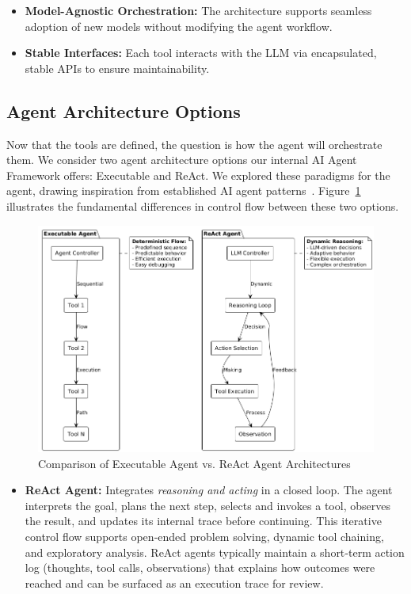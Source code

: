 \begin{spacing}{1.2}
\begin{itemize}
    \item \textbf{Model-Agnostic Orchestration:} The architecture supports seamless adoption of new models without modifying the agent workflow.
    \item \textbf{Stable Interfaces:} Each tool interacts with the LLM via encapsulated, stable APIs to ensure maintainability.
\end{itemize}

\subsection{Agent Architecture Options}
Now that the tools are defined, the question is how the agent will orchestrate them. We consider two agent architecture options our internal AI Agent Framework offers: Executable and ReAct. We explored these paradigms for the agent, drawing inspiration from established AI agent patterns~\cite{microsoftAgentPatterns}. Figure~\ref{fig:agent_comparison} illustrates the fundamental differences in control flow between these two options.

\begin{figure}[H] 
    \centering 
    \includegraphics[scale=0.6]{images/agent_architecture_comparison.png} 
    \caption{Comparison of Executable Agent vs. ReAct Agent Architectures} 
    \label{fig:agent_comparison} 
\end{figure}

\begin{itemize}
    \item \textbf{ReAct Agent:} Integrates \emph{reasoning and acting} in a closed loop. The agent interprets the goal, plans the next step, selects and invokes a tool, observes the result, and updates its internal trace before continuing. This iterative control flow supports open‑ended problem solving, dynamic tool chaining, and exploratory analysis. ReAct agents typically maintain a short‑term action log (thoughts, tool calls, observations) that explains how outcomes were reached and can be surfaced as an execution trace for review.
    

\end{itemize}
\end{spacing}
